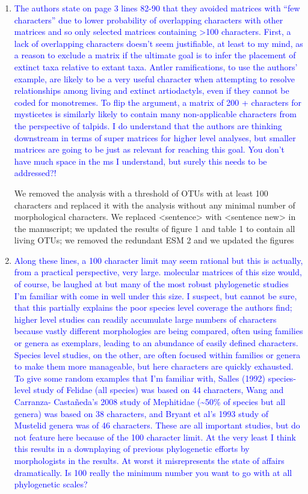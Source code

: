 \documentclass[12pt,letterpaper]{article}
\begin{document}
\begin{enumerate}
\item{\textcolor{blue}{The authors state on page 3 lines 82-90 that they avoided matrices with ``few characters'' due to lower probability of overlapping characters with other matrices and so only selected matrices containing >100 characters. First, a lack of overlapping characters doesn’t seem justifiable, at least to my mind, as a reason to exclude a matrix if the ultimate goal is to infer the placement of extinct taxa relative to extant taxa. Antler ramifications, to use the authors' example, are likely to be a very useful character when attempting to resolve relationships among living and extinct artiodactyls, even if they cannot be coded for monotremes. To flip the argument, a matrix of 200 + characters for mysticetes is similarly likely to contain many non-applicable characters from the perspective of talpids. I do understand that the authors are thinking downstream in terms of super matrices for higher level analyses, but smaller matrices are going to be just as relevant for reaching this goal. You don't have much space in the ms I understand, but surely this needs to be addressed?!}}

We removed the analysis with a threshold of OTUs with at least 100 characters and replaced it with the analysis without any minimal number of morphological characters.
We replaced <sentence> with <sentence new> in the manuscript; we updated the results of figure 1 and table 1 to contain all living OTUs; we removed the redundant ESM 2 and we updated the figures

\item{\textcolor{blue}{Along these lines, a 100 character limit may seem rational but this is actually, from a practical perspective, very large. molecular matrices of this size would, of course, be laughed at but many of the most robust phylogenetic studies I'm familiar with come in well under this size. I suspect, but cannot be sure, that this partially explains the poor species level coverage the authors find; higher level studies can readily accumulate large numbers of characters because vastly different morphologies are being compared, often using families or genera as exemplars, leading to an abundance of easily defined characters. Species level studies, on the other, are often focused within families or genera to make them more manageable, but here characters are quickly exhausted. To give some random examples that I'm familiar with, Salles (1992) species-level study of Felidae (all species) was based on 44 characters, Wang and Carranza- Casta\~{n}eda's 2008 study of Mephitidae (\textasciitilde50\% of species but all genera) was based on 38 characters, and Bryant et al's 1993 study of Mustelid genera was of 46 characters. These are all important studies, but do not feature here because of the 100 character limit. At the very least I think this results in a downplaying of previous phylogenetic efforts by morphologists in the results. At worst it misrepresents the state of affairs dramatically. Is 100 really the minimum number you want to go with at all phylogenetic scales?}}


\end{enumerate}
\end{document}
